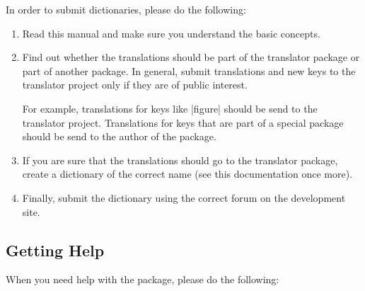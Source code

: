 \documentclass{ltxdoc}
\begin{document}
In order to submit dictionaries, please do the following:
\begin{enumerate}
\item Read this manual and make sure you understand the basic concepts.
\item Find out whether the translations should be part of the
  translator package or part of another package. In general, submit
  translations and new keys to the translator project only if they are
  of public interest.

  For example, translations for keys like |figure| should be send to
  the translator project. Translations for keys that are part of a
  special package should be send to the author of the package.
\item If you are sure that the translations should go to the
  translator package, create a dictionary of the correct name (see
  this documentation once more).
\item Finally, submit the dictionary using the correct forum on the
  development site. 
\end{enumerate}




\subsection{Getting Help}

When you need help with the package, please do the following:
\end{document}
